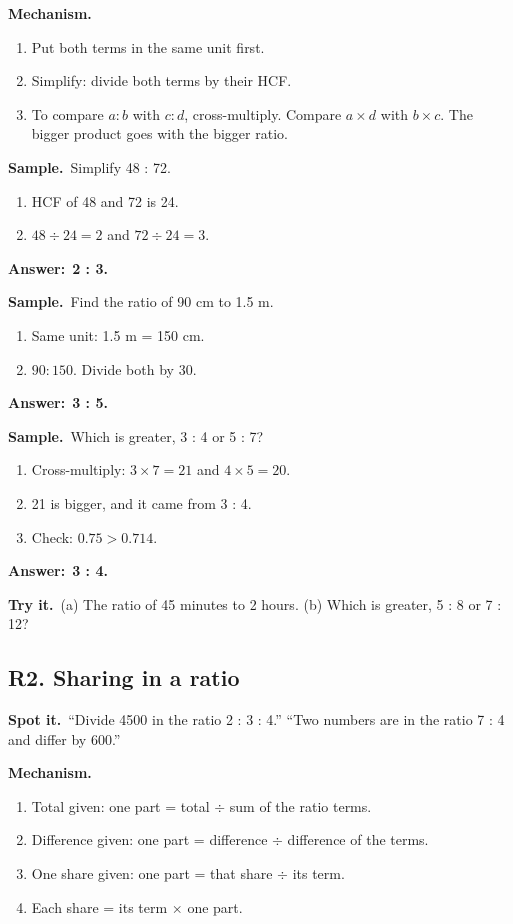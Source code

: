 \documentclass[11pt,a4paper]{article}
\let\oldsubsection\subsection
\renewcommand{\subsection}{\needspace{9\baselineskip}\oldsubsection}
\newcommand{\spot}{\textbf{\color{ember}Spot it.}\ }
\newcommand{\mech}{\textbf{\color{ember}Mechanism.}\ }
\newif\ifkeepsamp
\newcommand{\ans}[1]{\par\nopagebreak\noindent\textbf{\color{ember}Answer:}\ \textbf{#1}\par}
\newcommand{\samp}{\ifkeepsamp\needspace{4\baselineskip}\fi\textbf{\color{ember}Sample.}\ }
\newcommand{\tryit}[1]{\textbf{\color{ember}Try it.}\ #1}
\begin{document}
\mech
\begin{enumerate}
\item Put both terms in the same unit first.
\item Simplify: divide both terms by their HCF.
\item To compare $a : b$ with $c : d$, cross-multiply. Compare $a \times d$ with $b \times c$. The bigger product goes with the bigger ratio.
\end{enumerate}

\samp Simplify 48 : 72.
\begin{enumerate}
\item HCF of 48 and 72 is 24.
\item $48 \div 24 = 2$ and $72 \div 24 = 3$.
\end{enumerate}
\ans{2 : 3.}

\samp Find the ratio of 90 cm to 1.5 m.
\begin{enumerate}
\item Same unit: 1.5 m = 150 cm.
\item $90 : 150$. Divide both by 30.
\end{enumerate}
\ans{3 : 5.}

\samp Which is greater, 3 : 4 or 5 : 7?
\begin{enumerate}
\item Cross-multiply: $3 \times 7 = 21$ and $4 \times 5 = 20$.
\item 21 is bigger, and it came from 3 : 4.
\item Check: $0.75 > 0.714$.
\end{enumerate}
\ans{3 : 4.}

\tryit (a) The ratio of 45 minutes to 2 hours. (b) Which is greater, 5 : 8 or 7 : 12?

\subsection{R2. Sharing in a ratio}
\spot ``Divide 4500 in the ratio 2 : 3 : 4.'' ``Two numbers are in the ratio 7 : 4 and differ by 600.''

\mech
\begin{enumerate}
\item Total given: one part = total $\div$ sum of the ratio terms.
\item Difference given: one part = difference $\div$ difference of the terms.
\item One share given: one part = that share $\div$ its term.
\item Each share = its term $\times$ one part.
\end{enumerate}
\end{document}
